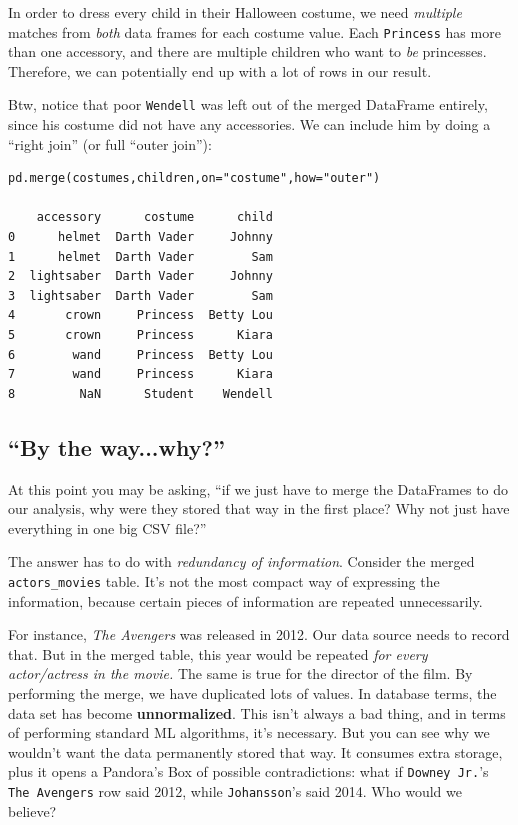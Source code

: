 \documentclass[12pt]{article}
\begin{document}
\begin{enumerate}
In order to dress every child in their Halloween costume, we need
\textit{multiple} matches from \textit{both} data frames for each costume
value. Each \texttt{Princess} has more than one accessory, and there are
multiple children who want to \textit{be} princesses. Therefore, we can
potentially end up with a lot of rows in our result.

Btw, notice that poor \texttt{Wendell} was left out of the merged DataFrame
entirely, since his costume did not have any accessories. We can include him
by doing a ``right join'' (or full ``outer join''):

\begin{Verbatim}[fontsize=\small,samepage=true,frame=none]
pd.merge(costumes,children,on="costume",how="outer")

    accessory      costume      child
0      helmet  Darth Vader     Johnny
1      helmet  Darth Vader        Sam
2  lightsaber  Darth Vader     Johnny
3  lightsaber  Darth Vader        Sam
4       crown     Princess  Betty Lou
5       crown     Princess      Kiara
6        wand     Princess  Betty Lou
7        wand     Princess      Kiara
8         NaN      Student    Wendell
\end{Verbatim}

\end{enumerate}

\pagebreak
\subsection{``By the way...why?''}

At this point you may be asking, ``if we just have to merge the DataFrames to
do our analysis, why were they stored that way in the first place? Why not
just have everything in one big CSV file?''

The answer has to do with \textit{redundancy of information}. Consider the
merged \texttt{actors\_movies} table. It's not the most compact way of
expressing the information, because certain pieces of information are repeated
unnecessarily.

For instance, \textit{The Avengers} was released in 2012. Our data source
needs to record that. But in the merged table, this year would be repeated
\textit{for every actor/actress in the movie.} The same is true for the
director of the film. By performing the merge, we have duplicated lots of
values. In database terms, the data set has become \textbf{unnormalized}. This
isn't always a bad thing, and in terms of performing standard ML algorithms,
it's necessary. But you can see why we wouldn't want the data permanently
stored that way. It consumes extra storage, plus it opens a Pandora's Box of
possible contradictions: what if \texttt{Downey Jr.}'s \texttt{The Avengers}
row said 2012, while \texttt{Johansson}'s said 2014. Who would we believe?
\end{document}
